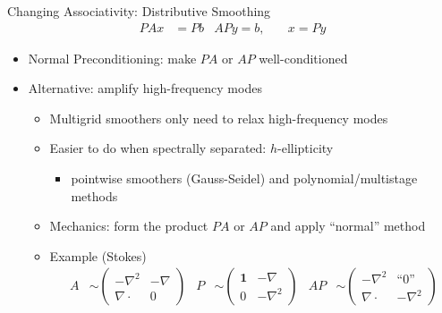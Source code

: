 \begin{frame}{Changing Associativity: Distributive Smoothing}
  \begin{align*}
    P A x &= P b & AP y = b, & \quad x = Py
  \end{align*}
  \begin{itemize}
  \item Normal Preconditioning: make $PA$ or $AP$ well-conditioned
  \item Alternative: amplify high-frequency modes
    \begin{itemize}
    \item Multigrid smoothers only need to relax high-frequency modes
    \item Easier to do when spectrally separated: $h$-ellipticity
      \begin{itemize}
      \item pointwise smoothers (Gauss-Seidel) and polynomial/multistage methods
      \end{itemize}
    \item Mechanics: form the product $PA$ or $AP$ and apply ``normal'' method
    \item Example (Stokes)
      \begin{align*}
        A &\sim \begin{pmatrix} -\nabla^2 & -\nabla \\ \nabla\cdot &
          0 \end{pmatrix} &
        P &\sim \begin{pmatrix} \bm 1 & -\nabla \\ 0 & -\nabla^2 \end{pmatrix} &
        AP &\sim
        \begin{pmatrix}
          -\nabla^2 & \text{``0''} \\ \nabla\cdot & -\nabla^2
        \end{pmatrix}
      \end{align*}
    \end{itemize}
  \end{itemize}
\end{frame}
